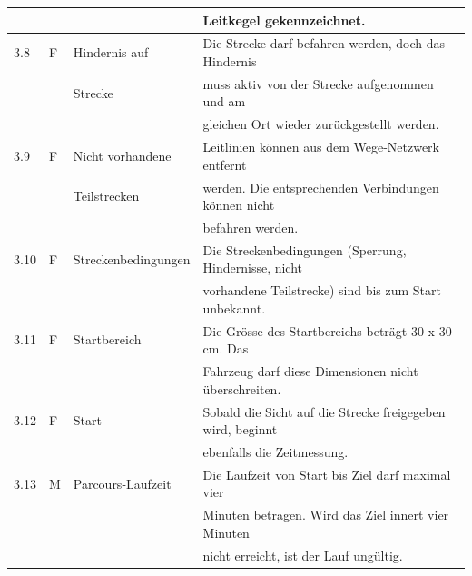 \documentclass[../main.tex]{subfiles}
\begin{document}
\begin{tabular}{|l|l|l|l|}
  & & & Leitkegel gekennzeichnet. \\
  \hline
  3.8 & F & Hindernis auf & Die Strecke darf befahren werden, doch
  das Hindernis \\
  & & Strecke & muss aktiv von der Strecke aufgenommen und am \\
  & & & gleichen Ort wieder zurückgestellt werden. \\
  \hline
  3.9 & F & Nicht vorhandene & Leitlinien können aus dem
  Wege-Netzwerk entfernt \\
  & & Teilstrecken & werden. Die entsprechenden Verbindungen können nicht \\
  & & & befahren werden. \\
  \hline
  3.10 & F & Streckenbedingungen & Die Streckenbedingungen (Sperrung,
    Hindernisse, nicht \\
  & & & vorhandene Teilstrecke) sind bis zum Start unbekannt. \\
  \hline
  3.11 & F & Startbereich & Die Grösse des Startbereichs beträgt 30 x
  30 cm. Das \\
  & & & Fahrzeug darf diese Dimensionen nicht überschreiten. \\
  \hline
  3.12 & F & Start & Sobald die Sicht auf die Strecke freigegeben
  wird, beginnt \\
  & & & ebenfalls die Zeitmessung. \\
  \hline
  3.13 & M & Parcours-Laufzeit & Die Laufzeit von Start bis Ziel darf
  maximal vier \\
  & & & Minuten betragen. Wird das Ziel innert vier Minuten \\
  & & & nicht erreicht, ist der Lauf ungültig. \\
  \hline
\end{tabular}
\end{document}
